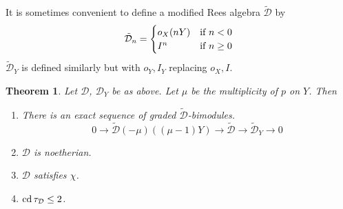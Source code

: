 \documentclass{amsproc}
\def\Dscr{{\mathcal D}}
\def\cd{\mathop{\text{cd}}}
\def\r{\rightarrow}
\let\oldtext\text
\def\text#1{\oldtext{\upshape #1}}
\newtheorem{theorems}[lemmas]{Theorem}
\theoremstyle{definition}
\theoremstyle{remark}
\numberwithin{equation}{section}
\numberwithin{table}{section}
\numberwithin{figure}{section}
\begin{document}
It is sometimes convenient to define a modified Rees algebra $\tilde{\Dscr}$ by
\begin{equation}
\label{ref:6.15a}
\tilde{\Dscr}_n
=
\begin{cases}
o_X(nY) &\text{if $n<0$}\\
I^n & \text{if $n\ge 0$}
\end{cases}
\end{equation}
$\tilde{\Dscr}_Y$ is defined similarly but with $o_Y,I_Y$ replacing
$o_X,I$. 

\begin{theorems} 
\label{ref:6.2.2a}
Let $\Dscr$, $\Dscr_Y$ be as above. Let $\mu$ be
the multiplicity of $p$ on $Y$. Then 
\begin{enumerate}
\item There is an exact sequence of graded $\tilde{\Dscr}$-bimodules.
\begin{equation}
\label{ref:6.16a}
0\r  \tilde{\Dscr}(-\mu)((\mu-1)Y)\r \tilde{\Dscr}\r
\tilde{\Dscr}_Y\r 0 
\end{equation}
\item $\Dscr$ is noetherian. 
\item $\Dscr$ satisfies $\chi$.
\item $\cd\tau_{\Dscr}\le 2$.
\end{enumerate}
\end{theorems}
\end{document}
